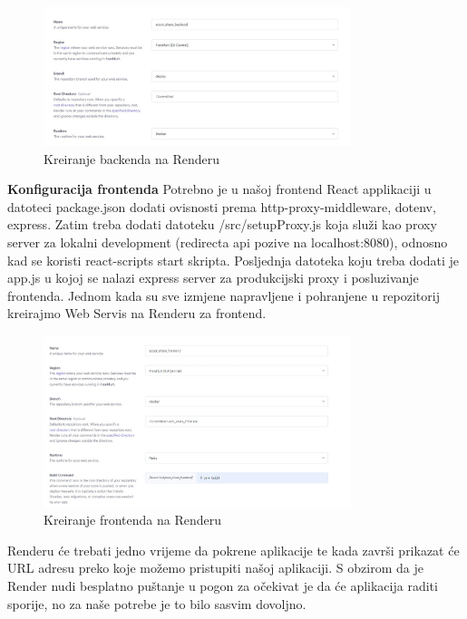		\begin{figure}[h]
			\centering
			\includegraphics[width=0.8\textwidth]{slike/pustanju_u_pogon_4.jpg}
			\caption{Kreiranje backenda na Renderu}
			\label{fig:backend_render}
		\end{figure}
		
		\textbf{Konfiguracija frontenda}
		Potrebno je u našoj frontend React applikaciji u datoteci package.json dodati ovisnosti prema http-proxy-middleware, dotenv, express. Zatim treba dodati datoteku /src/setupProxy.js koja služi kao proxy server za lokalni development (redirecta api pozive na localhost:8080), odnosno kad se koristi react-scripts start skripta. Posljednja datoteka koju treba dodati je app.js u kojoj se nalazi express server za produkcijski proxy i posluzivanje frontenda. Jednom kada su sve izmjene napravljene i pohranjene u repozitorij kreirajmo Web Servis na Renderu za frontend. 
			
		\begin{figure}[h]
			\centering
			\includegraphics[width=0.8\textwidth]{slike/pustanju_u_pogon_5.jpg}
			\caption{Kreiranje frontenda na Renderu}
			\label{fig:frontend_render}
		\end{figure}
		
		Renderu će trebati jedno vrijeme da pokrene aplikacije te kada završi prikazat će URL adresu preko koje možemo pristupiti našoj aplikaciji. S obzirom da je Render nudi besplatno puštanje u pogon za očekivat je da će aplikacija raditi sporije, no za naše potrebe je to bilo sasvim dovoljno.